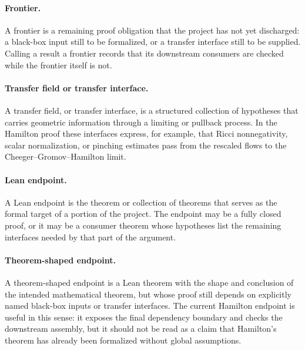 \documentclass[11pt]{article}
\theoremstyle{plain}
\theoremstyle{definition}
\theoremstyle{remark}
\begin{document}
\paragraph{Frontier.}
A frontier is a remaining proof obligation that the project has not yet
discharged: a black-box input still to be formalized, or a transfer interface
still to be supplied.  Calling a result a frontier records that its downstream
consumers are checked while the frontier itself is not.

\paragraph{Transfer field or transfer interface.}
A transfer field, or transfer interface, is a structured collection of
hypotheses that carries geometric information through a limiting or pullback
process.  In the Hamilton proof these interfaces express, for example, that
Ricci nonnegativity, scalar normalization, or pinching estimates pass from the
rescaled flows to the Cheeger--Gromov--Hamilton limit.

\paragraph{Lean endpoint.}
A Lean endpoint is the theorem or collection of theorems that serves as the
formal target of a portion of the project.  The endpoint may be a fully closed
proof, or it may be a consumer theorem whose hypotheses list the remaining
interfaces needed by that part of the argument.

\paragraph{Theorem-shaped endpoint.}
A theorem-shaped endpoint is a Lean theorem with the shape and conclusion of
the intended mathematical theorem, but whose proof still depends on explicitly
named black-box inputs or transfer interfaces.  The current Hamilton endpoint is
useful in this sense: it exposes the final dependency boundary and checks the
downstream assembly, but it should not be read as a claim that Hamilton's theorem
has already been formalized without global assumptions.
\end{document}
